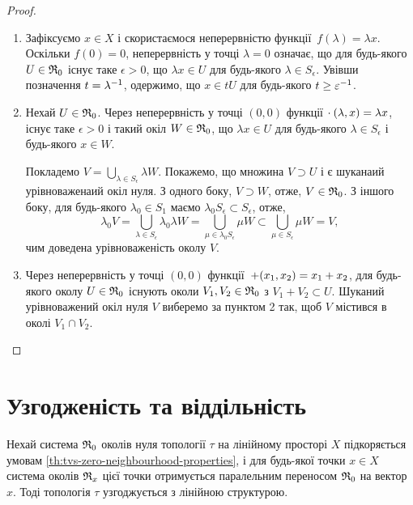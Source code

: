 \begin{proof}
    \listhack
    \begin{enumerate}
        \item Зафіксуємо $x \in X$ і скористаємося неперервністю функції~$f(\lambda) = \lambda x$. Оскільки $f(0) = 0$, неперервність у точці $\lambda = 0$ означає, що для будь-якого $U \in \frak R_0$ існує таке $\epsilon > 0$, що $\lambda x \in U$ для будь-якого $\lambda \in S_\epsilon$. Увівши позначення $t = \lambda\inv$, одержимо, що $x \in t U$ для будь-якого $t \ge \epsilon\inv$.

        \item Нехай $U \in \frak R_0$. Через неперервність у точці $(0, 0)$ функції $\MultiplicationFunction\:(\lambda, x) = \lambda x$, існує таке $\epsilon > 0$ і такий окіл $W \in \frak R_0$, що $\lambda x \in U$ для будь-якого $\lambda \in S_\epsilon$ і будь-якого $x \in W$.
        
        Покладемо $V = \bigcup_{\lambda \in S_\epsilon} \lambda W$. Покажемо, що множина $V \supset U$ і є шуканаий урівноваженаий окіл нуля. З одного боку, $V \supset W$, отже, $V \in \frak R_0$. З іншого боку, для будь-якого $\lambda_0 \in S_1$ маємо $\lambda_0 S_\epsilon \subset S_\epsilon$, отже,
        \begin{equation*}
            \lambda_0 V = \bigcup_{\lambda \in S_\epsilon} \lambda_0 \lambda W = \bigcup_{\mu \in \lambda_0 S_\epsilon} \mu W \subset \bigcup_{\mu \in S_\epsilon} \mu W = V,
        \end{equation*}
        чим доведена урівноваженість околу $V$.
    
        \item Через неперервність у точці $(0, 0)$ функції~$\AdditionFunction(x_1, x_2) = x_1 + x_2$, для будь-якого околу $U \in \frak R_0$ існують околи $V_1, V_2 \in \frak R_0$ з $V_1 + V_2 \subset U$. Шуканий урівноважений окіл нуля $V$ виберемо за пунктом 2 так, щоб $V$ містився в околі $V_1 \cap V_2$. \qedhere
    \end{enumerate}
\end{proof}

\section{Узгодженість та віддільність}

\begin{theorem}
    Нехай система $\frak R_0$ околів нуля топології $\tau$ на лінійному просторі $X$ підкоряється умовам \cref{th:tvs-zero-neighbourhood-properties}, і для будь-якої точки $x \in X$ система околів $\frak R_x$ цієї точки отримується паралельним переносом $\frak R_0$ на вектор $x$. Тоді топологія $\tau$ узгоджується з лінійною структурою.
\end{theorem}


